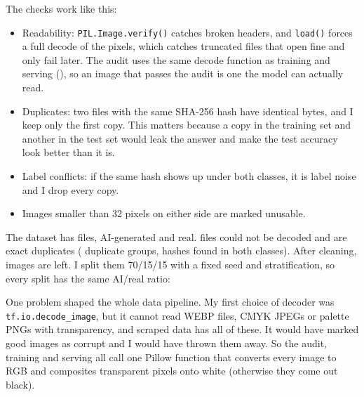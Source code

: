 The checks work like this:
\begin{itemize}
\item Readability: \texttt{PIL.Image.verify()} catches broken headers, and \texttt{load()} forces a
full decode of the pixels, which catches truncated files that open fine and only fail later. The
audit uses the same decode function as training and serving (),
so an image that passes the audit is one the model can actually read.
\item Duplicates: two files with the same SHA-256 hash have identical bytes, and I keep only the
first copy. This matters because a copy in the training set and another in the test set would leak
the answer and make the test accuracy look better than it is.
\item Label conflicts: if the same hash shows up under both classes, it is label noise and I drop
every copy.
\item Images smaller than 32 pixels on either side are marked unusable.
\end{itemize}


The dataset has \vgNFiles{} files, \vgNAI{} AI-generated and \vgNReal{} real. \vgNCorrupt{} files
could not be decoded and \vgNDup{} are exact duplicates (\vgNDupGroups{} duplicate groups,
\vgNConflicts{} hashes found in both classes). After cleaning, \vgNClean{} images are left. I split
them 70/15/15 with a fixed seed and stratification, so every split has the same AI/real ratio:



One problem shaped the whole data pipeline. My first choice of decoder was
\texttt{tf.io.decode\_image}, but it cannot read WEBP files, CMYK JPEGs or palette PNGs with
transparency, and scraped data has all of these. It would have marked good images as corrupt and I
would have thrown them away. So the audit, training and serving all call one Pillow function that
converts every image to RGB and composites transparent pixels onto white (otherwise they come out
black).

